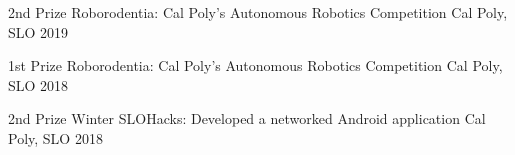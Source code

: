 



\begin{cvhonors}

  \cvhonor
    {2nd Prize} %
    {Roborodentia: Cal Poly's Autonomous Robotics Competition} %
    {Cal Poly, SLO} %
    {2019} %

  \cvhonor
    {1st Prize} %
    {Roborodentia: Cal Poly's Autonomous Robotics Competition} %
    {Cal Poly, SLO} %
    {2018} %

  \cvhonor
    {2nd Prize} %
    {Winter SLOHacks: Developed a networked Android application} %
    {Cal Poly, SLO} %
    {2018} %

\end{cvhonors}








